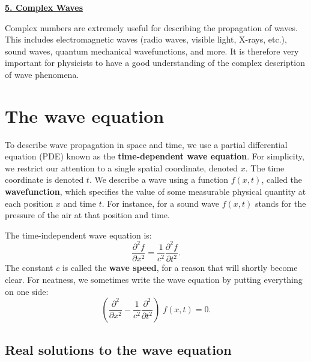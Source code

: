 \documentclass[10pt,a4paper]{article}
\begin{document}
\setcounter{page}{35}
\noindent
\underline{\textbf{\LARGE 5. Complex Waves}}
\vskip 0.1in

Complex numbers are extremely useful for describing the propagation of
waves. This includes electromagnetic waves (radio waves, visible
light, X-rays, etc.), sound waves, quantum mechanical wavefunctions,
and more.  It is therefore very important for physicists to have a
good understanding of the complex description of wave phenomena.

\section{The wave equation}
\label{the-wave-equation}

To describe wave propagation in space and time, we use a partial
differential equation (PDE) known as the \textbf{time-dependent wave
  equation}. For simplicity, we restrict our attention to a single
spatial coordinate, denoted $x$.  The time coordinate is denoted
$t$. We describe a wave using a function $f(x,t)$, called the
\textbf{wavefunction}, which specifies the value of some measurable
physical quantity at each position $x$ and time $t$. For instance, for
a sound wave $f(x,t)$ stands for the pressure of the air at that
position and time.

The time-independent wave equation is:
\begin{equation}
  \frac{\partial^2 f}{\partial x^2} = \frac{1}{c^2} \frac{\partial^2 f}{\partial t^2}.
  \label{wavepde}
\end{equation}
The constant $c$ is called the \textbf{wave speed}, for a reason that
will shortly become clear.  For neatness, we sometimes write the wave
equation by putting everything on one side:
\begin{equation}
  \left(\frac{\partial^2}{\partial x^2} - \frac{1}{c^2} \frac{\partial^2}{\partial t^2}\right) \; f(x,t) = 0.
\end{equation}

\subsection{Real solutions to the wave equation}
\label{real-solutions-to-the-wave-equation}
\end{document}
